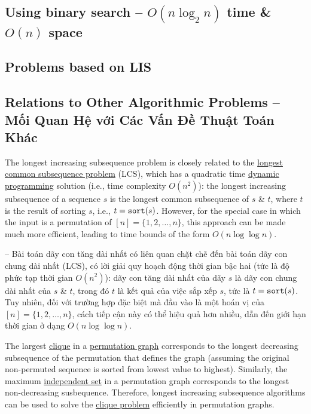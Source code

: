 \documentclass{article}
\begin{document}

\subsection{Using binary search -- $O(n\log_2n)$ time \& $O(n)$ space}


\subsection{Problems based on LIS}


\subsection{Relations to Other Algorithmic Problems -- Mối Quan Hệ với Các Vấn Đề Thuật Toán Khác}
The longest increasing subsequence problem is closely related to the \href{https://en.wikipedia.org/wiki/Longest_common_subsequence_problem}{longest common subsequence problem} (LCS), which has a quadratic time \href{https://en.wikipedia.org/wiki/Dynamic_programming}{dynamic programming} solution (i.e., time complexity $O(n^2)$): the longest increasing subsequence of a sequence $s$ is the longest common subsequence of $s$ \& $t$, where $t$ is the result of sorting $s$, i.e., $t = {\tt sort}(s)$. However, for the special case in which the input is a permutation of $[n] = \{1,2,\ldots,n\}$, this approach can be made much more efficient, leading to time bounds of the form $O(n\log\log n)$.

-- Bài toán dãy con tăng dài nhất có liên quan chặt chẽ đến bài toán dãy con chung dài nhất (LCS), có lời giải quy hoạch động thời gian bậc hai (tức là độ phức tạp thời gian $O(n^2)$): dãy con tăng dài nhất của dãy $s$ là dãy con chung dài nhất của $s$ \& $t$, trong đó $t$ là kết quả của việc sắp xếp $s$, tức là $t = {\tt sort}(s)$. Tuy nhiên, đối với trường hợp đặc biệt mà đầu vào là một hoán vị của $[n] = \{1,2,\ldots,n\}$, cách tiếp cận này có thể hiệu quả hơn nhiều, dẫn đến giới hạn thời gian ở dạng $O(n\log\log n)$.

The largest \href{https://en.wikipedia.org/wiki/Clique_(graph_theory)}{clique} in a \href{https://en.wikipedia.org/wiki/Permutation_graph}{permutation graph} corresponds to the longest decreasing subsequence of the permutation that defines the graph (assuming the original non-permuted sequence is sorted from lowest value to highest). Similarly, the maximum \href{https://en.wikipedia.org/wiki/Independent_set_(graph_theory)}{independent set} in a permutation graph corresponds to the longest non-decreasing susbequence. Therefore, longest increasing subsequence algorithms can be used to solve the \href{https://en.wikipedia.org/wiki/Clique_problem}{clique problem} efficiently in permutation graphs.
\end{document}
